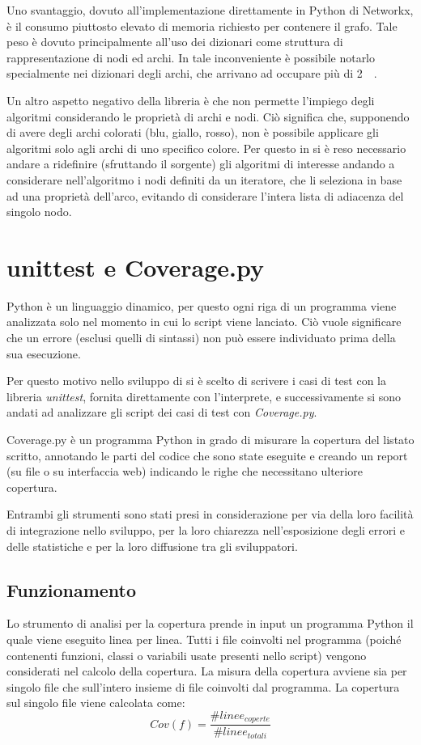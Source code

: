Uno svantaggio, dovuto all'implementazione direttamente in Python di
Networkx, è il consumo piuttosto elevato di memoria richiesto
per contenere il grafo. Tale peso è dovuto principalmente
all'uso dei dizionari come struttura di rappresentazione di nodi ed
archi. In \pygfa tale inconveniente è possibile notarlo specialmente
nei dizionari degli archi, che arrivano ad occupare più
di \SI{2}{\kilo\byte}.

Un altro aspetto negativo della libreria è che non permette l'impiego degli
algoritmi considerando le proprietà di archi e nodi. Ciò significa
che, supponendo di avere degli archi colorati (blu, giallo, rosso),
non è possibile applicare gli algoritmi solo agli archi di uno specifico
colore. Per questo in \pygfa si è reso necessario andare a ridefinire
(sfruttando il sorgente) gli algoritmi di interesse andando
a considerare nell'algoritmo i nodi definiti da un iteratore, che li
seleziona in base ad una proprietà dell'arco, evitando
di considerare l'intera lista di adiacenza del singolo nodo.

\section{unittest e Coverage.py}
Python è un linguaggio dinamico, per questo ogni
riga di un programma viene analizzata solo nel momento
in cui lo script viene lanciato. Ciò vuole significare che un errore
(esclusi quelli di sintassi) non può essere individuato prima
della sua esecuzione.

Per questo motivo nello sviluppo di \pygfa si è scelto di scrivere
i casi di test con la libreria \emph{unittest}, fornita direttamente
con l'interprete, e successivamente si sono andati ad analizzare
gli script dei casi di test con \emph{Coverage.py}.

Coverage.py è un programma Python in grado di misurare la
copertura del listato scritto, annotando le parti del codice che
sono state eseguite e creando un report (su file o su interfaccia web)
indicando le righe che necessitano ulteriore copertura.

Entrambi gli strumenti sono stati presi in considerazione per via
della loro facilità di integrazione nello sviluppo, per
la loro chiarezza nell'esposizione degli errori e delle statistiche
e per la loro diffusione tra gli sviluppatori.

\subsection{Funzionamento}
Lo strumento di analisi per la copertura prende in input un programma Python il quale
viene eseguito linea per linea. Tutti i file coinvolti nel programma
(poiché contenenti funzioni, classi o variabili usate presenti
nello script) vengono considerati nel calcolo della copertura. La
misura della copertura avviene sia per singolo file che sull'intero
insieme di file coinvolti dal programma. La copertura
sul singolo file viene calcolata come:
\begin{equation}
Cov(f) = \frac{\#linee_{coperte}}{\#linee_{totali}}
\end{equation}

